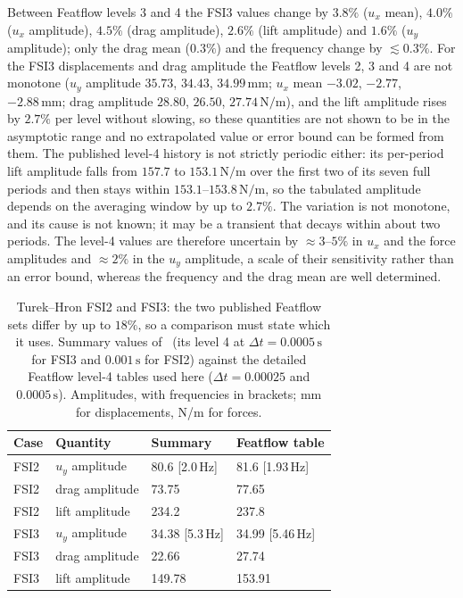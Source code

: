 Between Featflow levels 3 and 4 the FSI3 values change by $3.8\%$ ($u_x$ mean), $4.0\%$ ($u_x$ amplitude), $4.5\%$ (drag amplitude), $2.6\%$ (lift amplitude) and $1.6\%$ ($u_y$ amplitude); only the drag mean ($0.3\%$) and the frequency change by $\lesssim0.3\%$.
For the FSI3 displacements and drag amplitude the Featflow levels 2, 3 and 4 are not monotone ($u_y$ amplitude $35.73$, $34.43$, $34.99\,\mathrm{mm}$; $u_x$ mean $-3.02$, $-2.77$, $-2.88\,\mathrm{mm}$; drag amplitude $28.80$, $26.50$, $27.74\,\mathrm{N/m}$), and the lift amplitude rises by $2.7\%$ per level without slowing, so these quantities are not shown to be in the asymptotic range and no extrapolated value or error bound can be formed from them.
The published level-4 history is not strictly periodic either: its per-period lift amplitude falls from $157.7$ to $153.1\,\mathrm{N/m}$ over the first two of its seven full periods and then stays within $153.1$--$153.8\,\mathrm{N/m}$, so the tabulated amplitude depends on the averaging window by up to $2.7\%$. The variation is not monotone, and its cause is not known; it may be a transient that decays within about two periods.
The level-4 values are therefore uncertain by $\approx3$--$5\%$ in $u_x$ and the force amplitudes and $\approx2\%$ in the $u_y$ amplitude, a scale of their sensitivity rather than an error bound, whereas the frequency and the drag mean are well determined.

\begin{table}[htbp]
	\centering
	\small
	\setlength{\tabcolsep}{5pt}
	\caption{Turek--Hron FSI2 and FSI3: the two published Featflow sets differ by up to $18\%$, so a comparison must state which it uses. Summary values of~\citet{Turek2006} (its level 4 at $\Delta t = 0.0005\,\mathrm{s}$ for FSI3 and $0.001\,\mathrm{s}$ for FSI2) against the detailed Featflow level-4 tables used here ($\Delta t = 0.00025$ and $0.0005\,\mathrm{s}$). Amplitudes, with frequencies in brackets; mm for displacements, N/m for forces.}
	\label{tab:hronturek_ref}
	\begin{tabular}{llll}
		\toprule
		Case & Quantity & Summary~\citep{Turek2006} & Featflow table \\
		\midrule
		FSI2 & $u_y$ amplitude & 80.6 [2.0\,Hz] & 81.6 [1.93\,Hz] \\
		FSI2 & drag amplitude & 73.75 & 77.65 \\
		FSI2 & lift amplitude & 234.2 & 237.8 \\
		FSI3 & $u_y$ amplitude & 34.38 [5.3\,Hz] & 34.99 [5.46\,Hz] \\
		FSI3 & drag amplitude & 22.66 & 27.74 \\
		FSI3 & lift amplitude & 149.78 & 153.91 \\
		\bottomrule
	\end{tabular}
\end{table}

